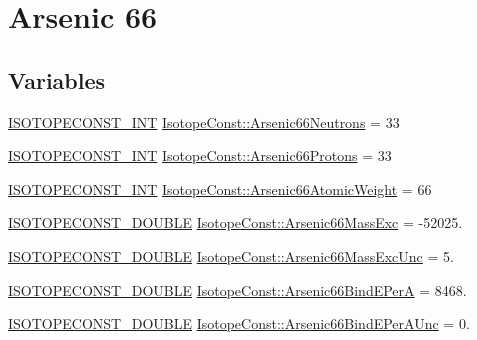 \hypertarget{group___isotope_const-_arsenic-_as66}{}\section{Arsenic 66}
\label{group___isotope_const-_arsenic-_as66}
\subsection*{Variables}
\begin{DoxyCompactItemize}
\item 
\mbox{\hyperlink{group___isotope_const-_macros_ga5f18360b3e99483a35c32d789e62621c}{I\+S\+O\+T\+O\+P\+E\+C\+O\+N\+S\+T\+\_\+\+I\+NT}} \mbox{\hyperlink{group___isotope_const-_arsenic-_as66_gafa5bcbfbc1d3c2072fc849fbc7b1b8a8}{Isotope\+Const\+::\+Arsenic66\+Neutrons}} = 33
\item 
\mbox{\hyperlink{group___isotope_const-_macros_ga5f18360b3e99483a35c32d789e62621c}{I\+S\+O\+T\+O\+P\+E\+C\+O\+N\+S\+T\+\_\+\+I\+NT}} \mbox{\hyperlink{group___isotope_const-_arsenic-_as66_ga7e68a0c555c6a83d64e2320619a7c468}{Isotope\+Const\+::\+Arsenic66\+Protons}} = 33
\item 
\mbox{\hyperlink{group___isotope_const-_macros_ga5f18360b3e99483a35c32d789e62621c}{I\+S\+O\+T\+O\+P\+E\+C\+O\+N\+S\+T\+\_\+\+I\+NT}} \mbox{\hyperlink{group___isotope_const-_arsenic-_as66_gae041fc271932abf298944536176e4bf6}{Isotope\+Const\+::\+Arsenic66\+Atomic\+Weight}} = 66
\item 
\mbox{\hyperlink{group___isotope_const-_macros_ga8f45a7272ce02c0b4c65c44636ed719a}{I\+S\+O\+T\+O\+P\+E\+C\+O\+N\+S\+T\+\_\+\+D\+O\+U\+B\+LE}} \mbox{\hyperlink{group___isotope_const-_arsenic-_as66_ga39a55677b0769a4231b2c5edd9691b44}{Isotope\+Const\+::\+Arsenic66\+Mass\+Exc}} = -\/52025.
\item 
\mbox{\hyperlink{group___isotope_const-_macros_ga8f45a7272ce02c0b4c65c44636ed719a}{I\+S\+O\+T\+O\+P\+E\+C\+O\+N\+S\+T\+\_\+\+D\+O\+U\+B\+LE}} \mbox{\hyperlink{group___isotope_const-_arsenic-_as66_ga0b773efed3aedeee0318fca58a92952e}{Isotope\+Const\+::\+Arsenic66\+Mass\+Exc\+Unc}} = 5.
\item 
\mbox{\hyperlink{group___isotope_const-_macros_ga8f45a7272ce02c0b4c65c44636ed719a}{I\+S\+O\+T\+O\+P\+E\+C\+O\+N\+S\+T\+\_\+\+D\+O\+U\+B\+LE}} \mbox{\hyperlink{group___isotope_const-_arsenic-_as66_ga9ac1b542e0620e6e8a99927200d6ab09}{Isotope\+Const\+::\+Arsenic66\+Bind\+E\+PerA}} = 8468.
\item 
\mbox{\hyperlink{group___isotope_const-_macros_ga8f45a7272ce02c0b4c65c44636ed719a}{I\+S\+O\+T\+O\+P\+E\+C\+O\+N\+S\+T\+\_\+\+D\+O\+U\+B\+LE}} \mbox{\hyperlink{group___isotope_const-_arsenic-_as66_gafa8163f1dac5312111a73cfe6764de3d}{Isotope\+Const\+::\+Arsenic66\+Bind\+E\+Per\+A\+Unc}} = 0.

\end{DoxyCompactItemize}
